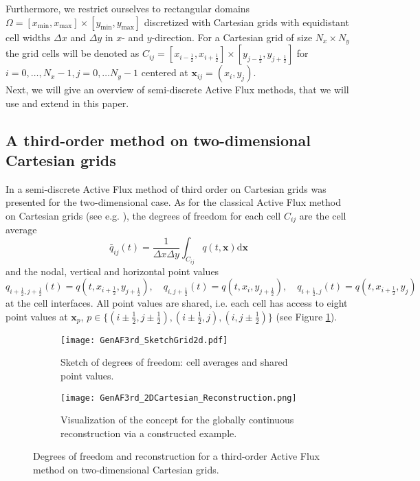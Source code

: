 \documentclass[12pt,a4paper]{article}
\begin{document}
Furthermore, we restrict ourselves to rectangular domains \(\Omega = [x_\mathrm{min}, x_\mathrm{max}] \times [y_\mathrm{min}, y_\mathrm{max}]\) discretized with Cartesian grids with equidistant cell widths $\Delta x$ and $\Delta y$ in $x$- and $y$-direction. For a Cartesian grid of size $N_x \times N_y$ the grid cells will be denoted as \(C_{ij} = [x_{i-\frac{1}{2}}, x_{i+\frac{1}{2}}] \times [y_{j-\frac{1}{2}}, y_{j+\frac{1}{2}}]\) for \(i = 0, \dots, N_x-1, j = 0, \dots N_y-1\) centered at \( \mathbf x_{ij} = (x_i, y_j)\).\\

Next, we will give an overview of semi-discrete Active Flux methods, that we will use and extend in this paper.






\subsection{A third-order method on two-dimensional Cartesian grids}
\label{Chap_GenAF3rd2dCartesian}
In \cite{ABK2025} a semi-discrete Active Flux method of third order on Cartesian grids was presented for the two-dimensional case. 
As for the classical Active Flux method on Cartesian grids (see e.g. \cite{BHKR2019,Helzel2019}),
the degrees of freedom for each cell \(C_{ij}\) are the cell average
\begin{equation}\label{Eq_CellAvAF3rd}
	\bar q_{ij}(t) = \frac{1}{\Delta x \Delta y} \int_{C_{ij}} q(t,\mathbf x) \mathrm d \mathbf x
\end{equation}
and the nodal, vertical and horizontal point values
\begin{equation}\label{Eq_NodesAF3rd}
	q_{i+\frac{1}{2}, j+ \frac{1}{2}}(t) = q(t, x_{i+\frac{1}{2}}, y_{j+ \frac{1}{2}}), 
	\quad q_{i, j+ \frac{1}{2}}(t) = q(t, x_{i}, y_{j+ \frac{1}{2}}), 
	\quad q_{i+\frac{1}{2}, j}(t) = q(t, x_{i+\frac{1}{2}}, y_{j})
\end{equation}
at the cell interfaces. All point values are shared, i.e. each cell has access to eight point values at $\mathbf x_p$, $p \in \{(i \pm \tfrac12, j\pm \tfrac12), (i \pm \tfrac12,j), (i,j \pm \tfrac12)\}$ (see Figure \ref{Fig_SketchGrid2D3rd}). 



\begin{figure}
\centering
	\begin{subfigure}[b]{0.45\textwidth}
	\centering		
		\texttt{[image: GenAF3rd\_SketchGrid2d.pdf]}
		\caption{Sketch of degrees of freedom: cell averages and shared point values.}
		\label{Fig_SketchGrid2D3rd} 
	\end{subfigure}
	\quad
	\begin{subfigure}[b]{0.45\textwidth}
	\centering
		\texttt{[image: GenAF3rd\_2DCartesian\_Reconstruction.png]}
		\caption{Visualization of the concept for the globally continuous reconstruction via a constructed example.}
		\label{Fig_ExampleReconstruction2D3rd} 
	\end{subfigure}
	\caption{Degrees of freedom and reconstruction for a third-order Active Flux method on two-dimensional Cartesian grids.}
\end{figure}
\end{document}
